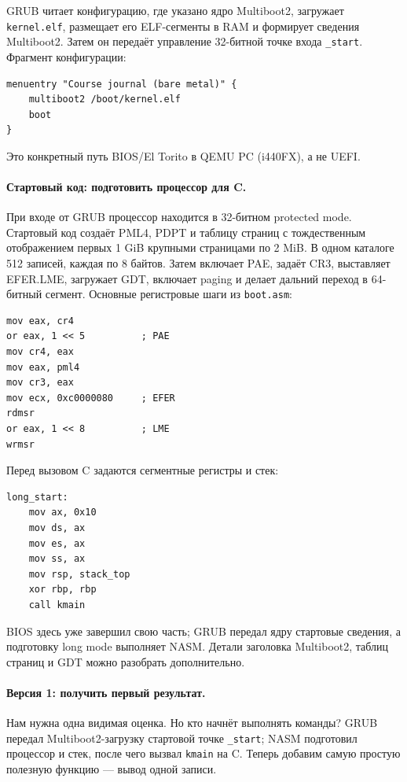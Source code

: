 GRUB читает конфигурацию, где указано ядро Multiboot2, загружает
\texttt{kernel.elf}, размещает его ELF-сегменты в RAM и формирует сведения
Multiboot2. Затем он передаёт управление 32-битной точке входа \texttt{\_start}.
Фрагмент конфигурации:
\begin{lstlisting}[basicstyle=\ttfamily\small]
menuentry "Course journal (bare metal)" {
    multiboot2 /boot/kernel.elf
    boot
}
\end{lstlisting}
Это конкретный путь BIOS/El Torito в QEMU PC (i440FX), а не UEFI.

\paragraph{Стартовый код: подготовить процессор для C.}
При входе от GRUB процессор находится в 32-битном protected mode.
Стартовый код создаёт PML4, PDPT и таблицу страниц с тождественным
отображением первых 1 GiB крупными страницами по 2 MiB. В одном каталоге
512 записей, каждая по 8 байтов. Затем включает PAE, задаёт CR3, выставляет
EFER.LME, загружает GDT, включает paging и делает дальний переход
в 64-битный сегмент. Основные регистровые шаги из \texttt{boot.asm}:
\begin{lstlisting}[basicstyle=\ttfamily\small]
mov eax, cr4
or eax, 1 << 5          ; PAE
mov cr4, eax
mov eax, pml4
mov cr3, eax
mov ecx, 0xc0000080     ; EFER
rdmsr
or eax, 1 << 8          ; LME
wrmsr
\end{lstlisting}
Перед вызовом C задаются сегментные регистры и стек:
\begin{lstlisting}[basicstyle=\ttfamily\small]
long_start:
    mov ax, 0x10
    mov ds, ax
    mov es, ax
    mov ss, ax
    mov rsp, stack_top
    xor rbp, rbp
    call kmain
\end{lstlisting}
BIOS здесь уже завершил свою часть; GRUB передал ядру стартовые сведения,
а подготовку long mode выполняет NASM. Детали заголовка Multiboot2,
таблиц страниц и GDT можно разобрать дополнительно.

\paragraph{Версия 1: получить первый результат.}
Нам нужна одна видимая оценка. Но кто начнёт выполнять команды?
GRUB передал Multiboot2-загрузку стартовой точке \texttt{\_start};
NASM подготовил процессор и стек, после чего вызвал \texttt{kmain} на C.
Теперь добавим самую простую полезную функцию --- вывод одной записи.


